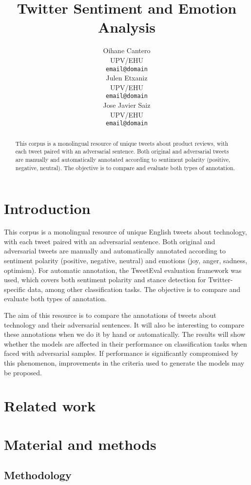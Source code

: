 \documentclass[11pt,a4paper]{article}
\title{Twitter Sentiment and Emotion Analysis}
\author{Oihane Cantero \\
  UPV/EHU \\
  \texttt{email@domain} \\\And
  Julen Etxaniz \\
  UPV/EHU \\
  \texttt{email@domain} \\\And
  Jose Javier Saiz \\
  UPV/EHU \\
  \texttt{email@domain} \\}
\date{}
\begin{document}
\maketitle
\begin{abstract}
This corpus is a monolingual resource of unique tweets about product reviews, with each tweet paired with an adversarial sentence. Both original and adversarial tweets are manually and automatically annotated according to sentiment polarity (positive, negative, neutral). The objective is to compare and evaluate both types of annotation.
\end{abstract}

\section{Introduction}

This corpus is a monolingual resource of unique English tweets about technology, with each tweet paired with an adversarial sentence. Both original and adversarial tweets are manually and automatically annotated according to sentiment polarity (positive, negative, neutral) and emotions (joy, anger, sadness, optimism). For automatic annotation, the TweetEval \cite{barbieri-etal-2020-tweeteval} evaluation framework  was used, which covers both sentiment polarity and stance detection for Twitter-specific data, among other classification tasks. The objective is to compare and evaluate both types of annotation.

The aim of this resource is to compare the annotations of tweets about technology and their adversarial sentences. It will also be interesting to compare these annotations when we do it by hand or automatically. The results will show whether the models are affected in their performance on classification tasks when faced with adversarial samples. If performance is significantly compromised by this phenomenon, improvements in the criteria used to generate the models may be proposed.

\section{Related work}

\section{Material and methods}

\subsection{Methodology}
\end{document}
